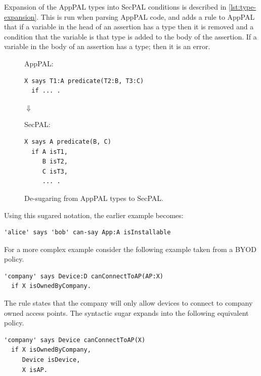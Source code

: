 \documentclass[thesis.tex]{subfiles}
\begin{document}
Expansion of the AppPAL types into SecPAL conditions is described in \autoref{lst:type-expansion}.
This is run when parsing AppPAL code, and adds a rule to AppPAL
  that if a variable in the head of an assertion has a type
  then it is removed and a condition that the variable is that type is added to the body of the assertion.
If a variable in the body of an assertion has a type; then it is an error.

\begin{figure}\centering
  AppPAL:
\begin{lstlisting}
X says T1:A predicate(T2:B, T3:C) 
  if ... .
\end{lstlisting}

  $\Downarrow$

  SecPAL:
\begin{lstlisting}
X says A predicate(B, C) 
  if A isT1, 
     B isT2, 
     C isT3, 
     ... .
\end{lstlisting}
  \caption{De-sugaring from AppPAL types to SecPAL.}
  \label{lst:type-expansion}
\end{figure}


Using this sugared notation, the earlier example becomes:
\begin{lstlisting}
'alice' says 'bob' can-say App:A isInstallable
\end{lstlisting}

For a more complex example consider the following example taken from a BYOD policy.
\begin{lstlisting}
'company' says Device:D canConnectToAP(AP:X)
  if X isOwnedByCompany.
\end{lstlisting}

The rule states that the company will only allow devices to connect to company owned access points.
The syntactic sugar expands into the following equivalent policy.

\begin{lstlisting}
'company' says Device canConnectToAP(X)
  if X isOwnedByCompany,
     Device isDevice,
     X isAP.
\end{lstlisting}
\end{document}
